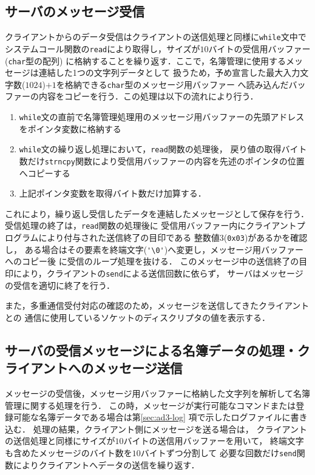 \subsection{サーバのメッセージ受信}
クライアントからのデータ受信はクライアントの送信処理と同様に\verb|while|文中で
システムコール関数の\verb|read|により取得し，サイズが$10$バイトの受信用バッファー(\verb|char|型の配列)
に格納することを繰り返す．ここで，名簿管理に使用するメッセージは連結した1つの文字列データとして
扱うため，予め宣言した最大入力文字数($1024$)$ + 1$を格納できる\verb|char|型のメッセージ用バッファー
へ読み込んだバッファーの内容をコピーを行う．この処理は以下の流れにより行う．
\begin{enumerate}
  \item \verb|while|文の直前で名簿管理処理用のメッセージ用バッファーの先頭アドレスをポインタ変数に格納する
  \item \verb|while|文の繰り返し処理において，\verb|read|関数の処理後，
  戻り値の取得バイト数だけ\verb|strncpy|関数により受信用バッファーの内容を先述のポインタの位置へコピーする
  \item 上記ポインタ変数を取得バイト数だけ加算する．
\end{enumerate}
これにより，繰り返し受信したデータを連結したメッセージとして保存を行う．
受信処理の終了は，\verb|read|関数の処理後に
受信用バッファー内にクライアントプログラムにより付与された送信終了の目印である
整数値$3$(\verb|0x03|)があるかを確認し，
ある場合はその要素を終端文字(\verb|'\0'|)へ変更し，メッセージ用バッファーへのコピー後
に受信のループ処理を抜ける．
このメッセージ中の送信終了の目印により，クライアントの\verb|send|による送信回数に依らず，
サーバはメッセージの受信を適切に終了を行う．

また，多重通信受付対応の確認のため，メッセージを送信してきたクライアントとの
通信に使用しているソケットのディスクリプタの値を表示する．

\subsection{サーバの受信メッセージによる名簿データの処理・クライアントへのメッセージ送信}
メッセージの受信後，メッセージ用バッファーに格納した文字列を解析して名簿管理に関する処理を行う．
この時，メッセージが実行可能なコマンドまたは登録可能な名簿データである場合は第\ref{sec:ad3-log}
項で示したログファイルに書き込む．
処理の結果，クライアント側にメッセージを送る場合は，
クライアントの送信処理と同様にサイズが$10$バイトの送信用バッファーを用いて，
終端文字も含めたメッセージのバイト数を$10$バイトずつ分割して
必要な回数だけ\verb|send|関数によりクライアントへデータの送信を繰り返す．

